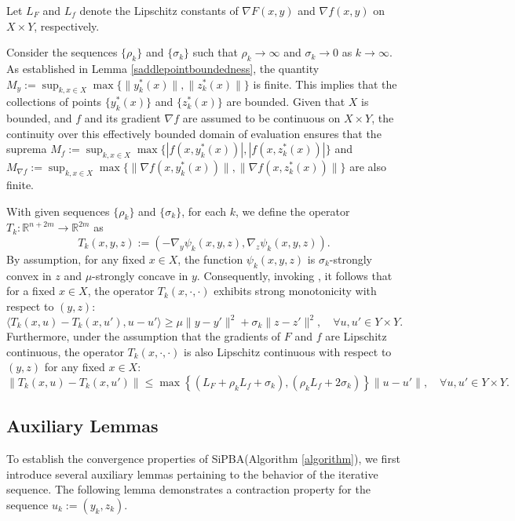 \documentclass{article}
\def\y{y}
\def\z{z}
\def\u{u}
\def\IR{\mathbb{R}}
\begin{document}
Let $L_F$ and $L_f$ denote the Lipschitz constants of $\nabla F(x,y)$ and $\nabla f(x,y)$ on $X \times Y$, respectively.


Consider the sequences $\{\rho_k\}$ and $\{\sigma_k\}$ such that $\rho_k \rightarrow \infty$ and $\sigma_k \rightarrow 0$ as $k \rightarrow \infty$. As established in Lemma \ref{saddlepointboundedness}, the quantity $M_y:= \sup_{k,x\in X} \max\{ \|y^*_{k}(x)\|,\|z^*_{k}(x)\| \}$ is finite. This implies that the collections of points $\{y^*_{k}(x)\}$ and $\{z^*_{k}(x)\}$ are bounded. Given that $X$ is bounded, and $f$ and its gradient $\nabla f$ are assumed to be continuous on $X \times Y$, the continuity over this effectively bounded domain of evaluation ensures that the suprema $M_{ f}:= \sup_{k,x\in X} \max\{ | f(x, y^*_{k}(x))|, |f(x, z^*_{k}(x))| \}$ and $M_{\nabla f}:= \sup_{k,x\in X} \max\{ \|\nabla f(x, y^*_{k}(x))\|,\| \nabla f(x, z^*_{k}(x))\| \}$ are also finite.

With given sequences $\{\rho_k\}$ and $\{\sigma_k\}$, for each $k$, we define the operator $T_k: \IR^{n+2m} \to\IR^{2m}$ as
\[
T_k(x,y,z) := \left( -\nabla_y \psi_k(x,y,z), \nabla_z \psi_k(x,y,z) \right).
\]
By assumption, for any fixed $x \in X$, the function $\psi_k(x,y,z)$ is $\sigma_k$-strongly convex in $z$ and $\mu$-strongly concave in $y$. Consequently, invoking \cite[Theorem 12.17 and Exercise 12.59]{rockafellar2009variational},  it follows that for a fixed $x \in X$, the operator $T_k(x,\cdot,\cdot)$ exhibits strong monotonicity with respect to $(y,z)$:
\begin{equation}\label{T_mono}
    \langle T_k(x,u) - T_k(x,u'), u- u' \rangle \ge \mu\|y-y'\|^2 + \sigma_k\|z-z'\|^2, \quad \forall u, u' \in Y \times Y.
\end{equation}
Furthermore, under the assumption that the gradients of $F$ and $f$ are Lipschitz continuous, the operator $T_k(x,\cdot,\cdot)$ is also Lipschitz continuous with respect to $(y,z)$ for any fixed $x \in X$:
\begin{equation}\label{T_Lip}
    \| T_k(x,u) - T_k(x,u') \| \le \max\left\{\left(L_F + \rho_k L_f + \sigma_k \right), \left( \rho_k L_f + 2\sigma_k \right) \right\} \| u - u'\|, \quad \forall u, u' \in Y \times Y.
\end{equation}

\subsection{Auxiliary Lemmas}

To establish the convergence properties of SiPBA(Algorithm \ref{algorithm}), we first introduce several auxiliary lemmas pertaining to the behavior of the iterative sequence. The following lemma demonstrates a contraction property for the sequence $\u_k:=(\y_k,\z_k)$.
     
\end{document}
